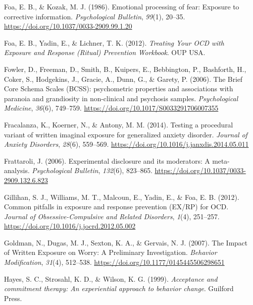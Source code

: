 \documentclass[
  man,floatsintext]{apa7}
\newlength{\cslhangindent}
\newlength{\cslentryspacingunit} %
\newenvironment{CSLReferences}[2] %
 {%
  \setlength{\parindent}{0pt}
  \ifodd #1
  \let\oldpar\par
  \def\par{\hangindent=\cslhangindent\oldpar}
  \fi
  \setlength{\parskip}{#2\cslentryspacingunit}
 }%
 {}
\begin{document}
\begin{CSLReferences}{1}{0}
\leavevmode{}%
Foa, E. B., \& Kozak, M. J. (1986). Emotional processing of fear: Exposure to corrective information. \emph{Psychological Bulletin}, \emph{99}(1), 20--35. \url{https://doi.org/10.1037/0033-2909.99.1.20}

\leavevmode{}%
Foa, E. B., Yadin, E., \& Lichner, T. K. (2012). \emph{Treating Your OCD with Exposure and Response (Ritual) Prevention Workbook}. OUP USA.

\leavevmode{}%
Fowler, D., Freeman, D., Smith, B., Kuipers, E., Bebbington, P., Bashforth, H., Coker, S., Hodgekins, J., Gracie, A., Dunn, G., \& Garety, P. (2006). The Brief Core Schema Scales (BCSS): psychometric properties and associations with paranoia and grandiosity in non-clinical and psychosis samples. \emph{Psychological Medicine}, \emph{36}(6), 749--759. \url{https://doi.org/10.1017/S0033291706007355}

\leavevmode{}%
Fracalanza, K., Koerner, N., \& Antony, M. M. (2014). Testing a procedural variant of written imaginal exposure for generalized anxiety disorder. \emph{Journal of Anxiety Disorders}, \emph{28}(6), 559--569. \url{https://doi.org/10.1016/j.janxdis.2014.05.011}

\leavevmode{}%
Frattaroli, J. (2006). Experimental disclosure and its moderators: A meta-analysis. \emph{Psychological Bulletin}, \emph{132}(6), 823--865. \url{https://doi.org/10.1037/0033-2909.132.6.823}

\leavevmode{}%
Gillihan, S. J., Williams, M. T., Malcoun, E., Yadin, E., \& Foa, E. B. (2012). Common pitfalls in exposure and response prevention (EX/RP) for OCD. \emph{Journal of Obsessive-Compulsive and Related Disorders}, \emph{1}(4), 251--257. \url{https://doi.org/10.1016/j.jocrd.2012.05.002}

\leavevmode{}%
Goldman, N., Dugas, M. J., Sexton, K. A., \& Gervais, N. J. (2007). The Impact of Written Exposure on Worry: A Preliminary Investigation. \emph{Behavior Modification}, \emph{31}(4), 512--538. \url{https://doi.org/10.1177/0145445506298651}

\leavevmode{}%
Hayes, S. C., Strosahl, K. D., \& Wilson, K. G. (1999). \emph{Acceptance and commitment therapy: An experiential approach to behavior change}. Guilford Press.


\end{CSLReferences}
\end{document}
